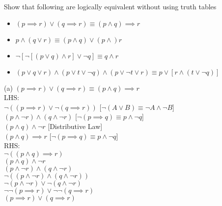 \documentclass[addpoints]{exam}
\newenvironment{problem}[2][Problem]{\begin{trivlist}
    \item[\hskip \labelsep {\bfseries #1}\hskip \labelsep {\bfseries #2.}]}{\end{trivlist}}
\begin{document}
\begin{sloppypar}
\begin{problem}{7}
Show that following are logically equivalent without using truth tables
\begin{itemize}
    \item[(a)] $ (p \implies r) \lor (q \implies r)  \equiv  (p \land q) \implies r $
    \item[(b)] $ p \land (q \lor r) \equiv (p \land q) \lor (p \land) r $
    \item[(c)] $ \neg [\neg[(p \lor q) \land r] \lor \neg q] \equiv q \land r $
        \item[(d)]$ (p \lor q \lor r) \land (p \lor t \lor \neg q) \land (p \lor \neg t \lor r) \equiv p \lor [r \land (t \lor \neg q)] $
\end{itemize}

\end{problem}

\begin{questions}
    \question
    \begin{solution}
        
        (a) $ (p \implies r) \lor (q \implies r)  \equiv  (p \land q) \implies r $ \\ 
        LHS: \\ 
        $ \neg((p \implies r) \lor \neg(q \implies r)) $ \hspace{10mm} {\color{red} [$ \neg (A \lor B) \equiv \neg A \land \neg B $]}\\ 
        $ (p \land \neg r) \land (q \land \neg r) $ \hspace{21.5mm} {\color{red} [$ \neg (p \implies q) \equiv p \land \neg q $]}\\ 
        $ (p \land q) \land \neg r $ \hspace{31mm} { \color{red} [Distributive Law]}\\ 
        $ (p \land q) \implies r $ \hspace{27.5mm} { \color{red} [$ \neg (p\implies q) \equiv p \land \neg q $]} \\ 
        RHS: \\ 
        $ \neg ((p \land q) \implies r) $ \\ 
        $ (p \land q) \land \neg r $ \\ 
        $ (p \land \neg r) \land (q \land \neg r) $ \\ 
        $ \neg ((p \land \neg r) \land (q \land \neg r)) $ \\ 
        $ \neg (p \land \neg r) \lor \neg(q \land \neg r) $ \\ 
        $ \neg \neg (p \implies r) \lor \neg \neg (q \implies r) $ \\ 
        $ (p \implies r) \lor (q \implies r) $ 


\end{solution}
\end{questions}
\end{sloppypar}
\end{document}
